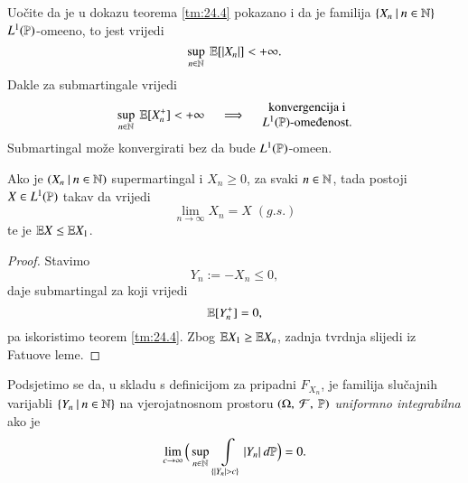 \begin{nap} \label{nap:24.6}
    Uo\v cite da je u dokazu teorema \ref{tm:24.4} pokazano i da je familija $\{{X_n} \: | \: {n \in \mathbb{N}}\}$ $L^1 (\mathbb{P})$-ome\dj eno, to jest vrijedi
    \begin{equation*}
        \sup\limits_{n \in \mathbb{N}} \: \mathbb{E} [|X_n|] < +\infty.
    \end{equation*}
    Dakle za submartingale vrijedi
    \begin{equation*}
        \sup\limits_{n \in \nat} \: \masE [X_n^+] < +\infty \quad \implies \quad
        \begin{matrix}
            \textnormal{konvergencija i}\\
            L^1 (\masP) \textnormal{-ome\dj enost.}
        \end{matrix}
    \end{equation*}
    Submartingal mo\v ze konvergirati bez da bude $L^1 (\mathbb{P})$-ome\dj en.
\end{nap}

\begin{kor} \label{kor:24.7}
    Ako je $({X_n} \: | \: {n \in \mathbb{N}})$ supermartingal i $X_n \geq 0$, za svaki $n \in \mathbb{N}$, tada postoji $X \in L^1 (\mathbb{P})$ takav da vrijedi
    \begin{equation*}
        \lim\limits_{n \to \infty} X_n = X \; (g.s.)
    \end{equation*}
    te je $\mathbb{E} X \leq \mathbb{E} X_1$.
\end{kor}

\begin{proof}
    Stavimo
    \begin{equation*}
        Y_n := - X_n \leq 0,
    \end{equation*}
    daje submartingal za koji vrijedi
    \begin{equation*}
        \mathbb{E} [Y_n^+] = 0,
    \end{equation*}
    pa iskoristimo teorem \ref{tm:24.4}.
    Zbog $\mathbb{E} X_1 \geq \mathbb{E} X_n$, zadnja tvrdnja slijedi iz Fatuove leme.
\end{proof}

Podsjetimo se da, u skladu s definicijom za pripadni $F_{X_n}$, je familija slu\v cajnih varijabli $\{{Y_n} \: | \: {n \in \mathbb{N}}\}$ na vjerojatnosnom prostoru $(\Omega, \: \mathcal{F}, \: \mathbb{P})$ \emph{uniformno integrabilna} ako je
\begin{equation}    \label{jed:24.8}
    \lim\limits_{c \to \infty} \Big( \sup\limits_{n \in \mathbb{N}} \: \int\limits_{\{ |Y_n| > c \}} |Y_n| \: d \mathbb{P} \Big) = 0.
\end{equation}

